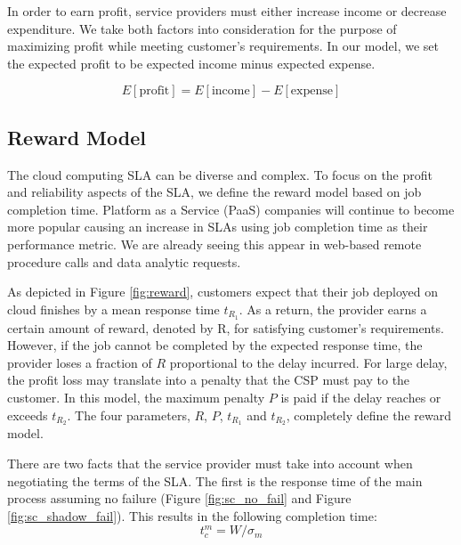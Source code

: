 In order to earn profit, service providers must either increase
income or decrease expenditure. We take both factors into
consideration for the purpose of maximizing profit while meeting
customer's requirements. In our model, we set the expected profit to be
expected income minus expected expense.

\begin{equation}
E[\text{profit}]=E[\text{income}]-E[\text{expense}]
\end{equation}

\subsection{Reward Model}
\label{sla_reward_model}
The cloud computing SLA can be diverse and
complex. To focus on the profit and reliability
aspects of the SLA, we define the reward model based on job completion
time. Platform as a Service (PaaS) companies will continue to become
more popular causing an increase in SLAs using job completion time as
their performance metric. We are already seeing this appear in
web-based remote procedure calls and data analytic requests.

As depicted in Figure \ref{fig:reward}, customers expect that their
job deployed on cloud finishes by a mean response time $t_{R_1}$.  As a
return, the provider earns a certain amount of reward, denoted by R,
for satisfying customer's requirements. However, if the job cannot be
completed by the expected response time, the provider loses a fraction of $R$
proportional to the delay incurred. For large delay, the profit loss may translate into a penalty that the CSP must pay to the customer. In this model, the maximum penalty $P$ is paid if the
delay reaches or exceeds $t_{R_2}$. The four
parameters, $R$, $P$, $t_{R_1}$ and
$t_{R_2}$, completely define the reward model.

%

There are two facts that the service provider must take into account
when negotiating the terms of the SLA. The first is the response time
of the main process assuming no failure (Figure
\ref{fig:sc_no_fail} and Figure \ref{fig:sc_shadow_fail}). This
results in the following completion time:
\begin{equation}
t_c^m=W/\sigma_m
\label{eq:tcm}
\end{equation}

